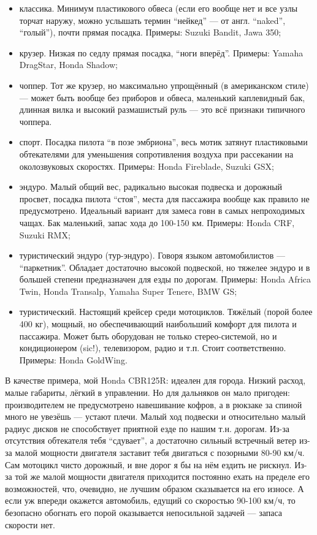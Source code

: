 \documentclass[12pt,a4paper]{article}
\begin{document}
\begin{itemize}
\item классика. Минимум пластикового обвеса (если его вообще нет и все
узлы торчат наружу, можно услышать термин ``нейкед'' --- от англ. ``naked'',
``голый''), почти прямая посадка. Примеры: Suzuki Bandit, Jawa 350;
\item крузер. Низкая по седлу прямая посадка, ``ноги вперёд''. Примеры:
Yamaha DragStar, Honda Shadow;
\item чоппер. Тот же крузер, но максимально упрощённый (в американском
стиле) --- может быть вообще без приборов и обвеса, маленький каплевидный
бак, длинная вилка и высокий размашистый руль --- это всё признаки
типичного чоппера.
\item спорт. Посадка пилота ``в позе эмбриона'', весь мотик затянут
пластиковыми обтекателями для уменьшения сопротивления воздуха при
рассекании на околозвуковых скоростях. Примеры: Honda Fireblade,
Suzuki GSX;
\item эндуро. Малый общий вес, радикально высокая подвеска и дорожный
просвет, посадка пилота ``стоя'', места для пассажира вообще как
правило не предусмотрено. Идеальный вариант для замеса говн в самых
непроходимых чащах. Бак маленький, запас хода до 100-150 км. Примеры:
Honda CRF, Suzuki RMX;
\item туристический эндуро (тур-эндуро). Говоря языком автомобилистов ---
``паркетник''. Обладает достаточно высокой подвеской, но тяжелее эндуро
и в большей степени предназначен для езды по дорогам. Примеры: Honda
Africa Twin, Honda Transalp, Yamaha Super Tenere, BMW GS;
\item туристический. Настоящий крейсер среди мотоциклов. Тяжёлый (порой
более 400 кг), мощный, но обеспечивающий наибольший комфорт для
пилота и пассажира. Может быть оборудован не только стерео-системой,
но и кондиционером (sic!), телевизором, радио и т.п. Стоит
соответственно. Примеры: Honda GoldWing.
\end{itemize}

В качестве примера, мой Honda CBR125R: идеален для города. Низкий
расход, малые габариты, лёгкий в управлении. Но для дальняков он мало
пригоден: производителем не предусмотрено навешивание кофров, а в
рюкзаке за спиной много не увезёшь --- устают плечи. Малый ход подвески
и относительно малый радиус дисков не способствует приятной езде по
нашим т.н. дорогам. Из-за отсутствия обтекателя тебя ``сдувает'', а
достаточно сильный встречный ветер из-за малой мощности двигателя
заставит тебя двигаться с позорными 80-90 км/ч. Сам мотоцикл чисто
дорожный, и вне дорог я бы на нём ездить не рискнул.
Из-за той же малой мощности двигателя приходится постоянно ехать на
пределе его возможностей, что, очевидно, не лучшим образом
сказывается на его износе. А если уж впереди окажется автомобиль,
едущий со скоростью 90-100 км/ч, то безопасно обогнать его порой
оказывается непосильной задачей --- запаса скорости нет.
\end{document}
